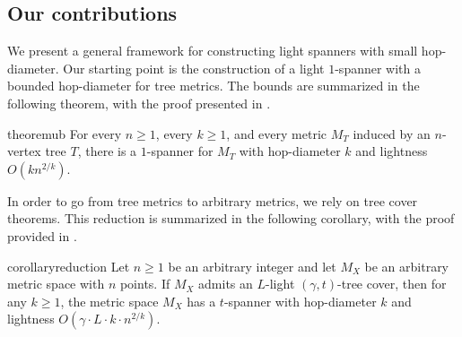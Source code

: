 \documentclass[11pt,english]{article}
\begin{document}
\subsection{Our contributions}
We present a general framework for constructing light spanners with small hop-diameter. Our starting point is the construction of a light $1$-spanner with a bounded hop-diameter for tree metrics. 
The bounds are summarized in the following theorem, with the proof presented in .

\begin{restatable}{theorem}{ub}\label{thm:ub}
For every $n \ge 1$, every $k\ge 1$, and every metric $M_T$ induced by an $n$-vertex tree $T$, there is a $1$-spanner for $M_T$ with hop-diameter $k$ and lightness $O(kn^{2/k})$.
\end{restatable}

In order to go from tree metrics to arbitrary metrics, we rely on tree cover theorems. This reduction is summarized in the following corollary, with the proof provided in .


\begin{restatable}{corollary}{reduction}\label{cor:reduction}
Let $n \ge 1$ be an arbitrary integer and let $M_X$ be an arbitrary metric space with $n$ points. If $M_X$ admits an $L$-light $(\gamma,t)$-tree cover, then for any $k\ge 1$, the metric space $M_X$ has a $t$-spanner with hop-diameter $k$ and lightness $O(\gamma\cdot L\cdot k\cdot n^{2/k})$.
\end{restatable}
\end{document}
